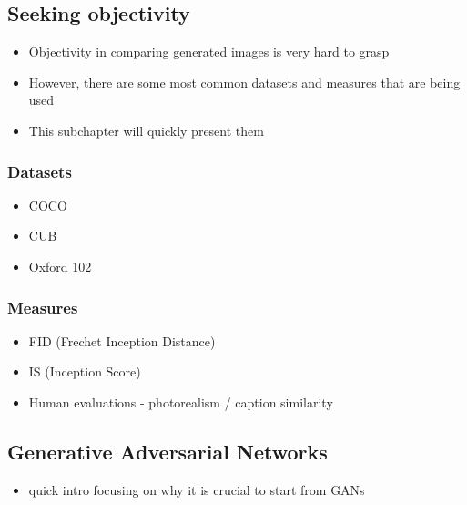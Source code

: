\documentclass[
]{krantz}
\providecommand{\tightlist}{%
  \setlength{\itemsep}{0pt}\setlength{\parskip}{0pt}}
\begin{document}
\hypertarget{seeking-objectivity}{%
\subsection{Seeking objectivity}\label{seeking-objectivity}}

\begin{itemize}
\tightlist
\item
  Objectivity in comparing generated images is very hard to grasp
\item
  However, there are some most common datasets and measures that are being used
\item
  This subchapter will quickly present them
\end{itemize}

\hypertarget{datasets-1}{%
\subsubsection{Datasets}\label{datasets-1}}

\begin{itemize}
\tightlist
\item
  COCO
\item
  CUB
\item
  Oxford 102
\end{itemize}

\hypertarget{measures}{%
\subsubsection{Measures}\label{measures}}

\begin{itemize}
\tightlist
\item
  FID (Frechet Inception Distance)
\item
  IS (Inception Score)
\item
  Human evaluations - photorealism / caption similarity
\end{itemize}

\hypertarget{generative-adversarial-networks}{%
\subsection{Generative Adversarial Networks}\label{generative-adversarial-networks}}

\begin{itemize}
\tightlist
\item
  quick intro focusing on why it is crucial to start from GANs
\end{itemize}
\end{document}
